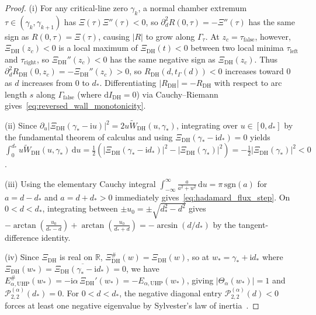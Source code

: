\documentclass[11pt,reqno]{amsart}
\theoremstyle{definition}
\theoremstyle{remark}
\numberwithin{equation}{section}
\newcommand{\R}{\mathbb{R}}
\newcommand{\dd}{\mathrm{d}}
\newcommand{\ii}{\mathrm{i}}
\newcommand{\sgn}{\mathrm{sgn}}
\newcommand{\DHf}{\mathrm{DH}}
\begin{document}
\begin{proof}
(i) For any critical-line zero $\gamma_k$, a normal chamber extremum $\tau \in (\gamma_k, \gamma_{k+1})$ has $\Xi(\tau)\Xi''(\tau) < 0$, so $\partial_d^2 R(0,\tau) = -\Xi''(\tau)$ has the same sign as $R(0,\tau) = \Xi(\tau)$, causing $|R|$ to grow along $\Gamma_\tau$. At $z_c = \tau_{\mathrm{false}}$, however, $\Xi_{\DHf}(z_c) < 0$ is a local maximum of $\Xi_{\DHf}(t) < 0$ between two local minima $\tau_{\mathrm{left}}$ and $\tau_{\mathrm{right}}$, so $\Xi_{\DHf}''(z_c) < 0$ has the same negative sign as $\Xi_{\DHf}(z_c)$. Thus $\partial_d^2 R_{\DHf}(0, z_c) = -\Xi_{\DHf}''(z_c) > 0$, so $R_{\DHf}(d, t_\Gamma(d)) < 0$ increases toward $0$ as $d$ increases from $0$ to $d_*$. Differentiating $|R_{\DHf}| = -R_{\DHf}$ with respect to arc length $s$ along $\Gamma_{\mathrm{false}}$ (where $\dd I_{\DHf} = 0$) via Cauchy--Riemann gives~\eqref{eq:reversed_wall_monotonicity}.

(ii) Since $\partial_u|\Xi_{\DHf}(\gamma_* - \ii u)|^2 = 2u\widetilde{W}_{\DHf}(u, \gamma_*)$, integrating over $u \in [0, d_*]$ by the fundamental theorem of calculus and using $\Xi_{\DHf}(\gamma_* - \ii d_*) = 0$ yields $\int_0^{d_*} u\widetilde{W}_{\DHf}(u, \gamma_*)\,\dd u = \frac{1}{2}(|\Xi_{\DHf}(\gamma_* - \ii d_*)|^2 - |\Xi_{\DHf}(\gamma_*)|^2) = -\frac{1}{2}|\Xi_{\DHf}(\gamma_*)|^2 < 0$.

(iii) Using the elementary Cauchy integral $\int_{-\infty}^\infty \frac{a}{a^2+u^2}\,\dd u = \pi\,\sgn(a)$ for $a = d - d_*$ and $a = d + d_* > 0$ immediately gives~\eqref{eq:hadamard_flux_step}. On $0 < d < d_*$, integrating between $\pm u_0 = \pm\sqrt{d_*^2 - d^2}$ gives $-\arctan(\frac{u_0}{d_*-d}) + \arctan(\frac{u_0}{d_*+d}) = -\arcsin(d/d_*)$ by the tangent-difference identity.

(iv) Since $\Xi_{\DHf}$ is real on $\R$, $\Xi_{\DHf}^\#(w) = \Xi_{\DHf}(w)$, so at $w_* = \gamma_* + \ii d_*$ where $\Xi_{\DHf}(w_*) = \overline{\Xi_{\DHf}(\gamma_* - \ii d_*)} = 0$, we have $E_{\alpha,\mathrm{UHP}}^\#(w_*) = -\ii\alpha\,\Xi_{\DHf}'(w_*) = -E_{\alpha,\mathrm{UHP}}(w_*)$, giving $|\Theta_\alpha(w_*)| = 1$ and $\mathcal{P}_{2,2}^{(\alpha)}(d_*) = 0$. For $0 < d < d_*$, the negative diagonal entry $\mathcal{P}_{2,2}^{(\alpha)}(d) < 0$ forces at least one negative eigenvalue by Sylvester's law of inertia~\cite{iohvidov1982}.
\end{proof}
\end{document}
